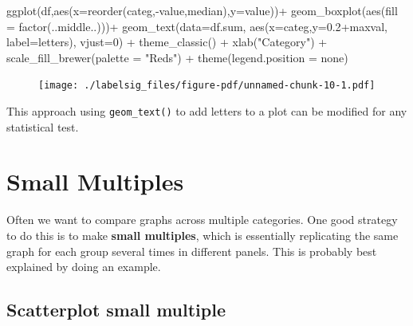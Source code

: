 \documentclass[
  letterpaper,
  DIV=11,
  numbers=noendperiod]{scrreprt}
\newenvironment{Shaded}{\begin{snugshade}}{\end{snugshade}}
\newcommand{\AttributeTok}[1]{\textcolor[rgb]{0.40,0.45,0.13}{#1}}
\newcommand{\DecValTok}[1]{\textcolor[rgb]{0.68,0.00,0.00}{#1}}
\newcommand{\FloatTok}[1]{\textcolor[rgb]{0.68,0.00,0.00}{#1}}
\newcommand{\FunctionTok}[1]{\textcolor[rgb]{0.28,0.35,0.67}{#1}}
\newcommand{\NormalTok}[1]{\textcolor[rgb]{0.00,0.23,0.31}{#1}}
\newcommand{\SpecialCharTok}[1]{\textcolor[rgb]{0.37,0.37,0.37}{#1}}
\newcommand{\StringTok}[1]{\textcolor[rgb]{0.13,0.47,0.30}{#1}}
\begin{document}
\begin{Shaded}
\begin{Highlighting}[]
\FunctionTok{ggplot}\NormalTok{(df,}\FunctionTok{aes}\NormalTok{(}\AttributeTok{x=}\FunctionTok{reorder}\NormalTok{(categ,}\SpecialCharTok{{-}}\NormalTok{value,median),}\AttributeTok{y=}\NormalTok{value))}\SpecialCharTok{+}
  \FunctionTok{geom\_boxplot}\NormalTok{(}\FunctionTok{aes}\NormalTok{(}\AttributeTok{fill =} \FunctionTok{factor}\NormalTok{(..middle..)))}\SpecialCharTok{+}
  \FunctionTok{geom\_text}\NormalTok{(}\AttributeTok{data=}\NormalTok{df.sum,}
            \FunctionTok{aes}\NormalTok{(}\AttributeTok{x=}\NormalTok{categ,}\AttributeTok{y=}\FloatTok{0.2}\SpecialCharTok{+}\NormalTok{maxval,}
                \AttributeTok{label=}\NormalTok{letters), }\AttributeTok{vjust=}\DecValTok{0}\NormalTok{) }\SpecialCharTok{+}
  \FunctionTok{theme\_classic}\NormalTok{() }\SpecialCharTok{+}
  \FunctionTok{xlab}\NormalTok{(}\StringTok{"Category"}\NormalTok{) }\SpecialCharTok{+}
  \FunctionTok{scale\_fill\_brewer}\NormalTok{(}\AttributeTok{palette =} \StringTok{"Reds"}\NormalTok{) }\SpecialCharTok{+}
  \FunctionTok{theme}\NormalTok{(}\AttributeTok{legend.position =} \StringTok{\textquotesingle{}none\textquotesingle{}}\NormalTok{)}
\end{Highlighting}
\end{Shaded}

\begin{figure}[H]

{\centering \texttt{[image: ./labelsig\_files/figure-pdf/unnamed-chunk-10-1.pdf]}

}

\end{figure}

This approach using \texttt{geom\_text()} to add letters to a plot can
be modified for any statistical test.


\hypertarget{small-multiples}{%
\chapter{Small Multiples}\label{small-multiples}}

Often we want to compare graphs across multiple categories. One good
strategy to do this is to make \textbf{small multiples}, which is
essentially replicating the same graph for each group several times in
different panels. This is probably best explained by doing an example.

\hypertarget{scatterplot-small-multiple}{%
\section{\texorpdfstring{\textbf{Scatterplot small
multiple}}{Scatterplot small multiple}}\label{scatterplot-small-multiple}}
\end{document}
